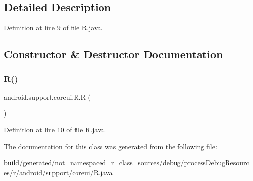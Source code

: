 \subsection{Detailed Description}


Definition at line 9 of file R.\+java.



\subsection{Constructor \& Destructor Documentation}
\mbox{\label{classandroid_1_1support_1_1coreui_1_1_r_a3da75b0c0738bf933a54234a5d209dbd}} 
\subsubsection{\texorpdfstring{R()}{R()}}
{\footnotesize\ttfamily android.\+support.\+coreui.\+R.\+R (\begin{DoxyParamCaption}{ }\end{DoxyParamCaption})\hspace{0.3cm}{\ttfamily [private]}}



Definition at line 10 of file R.\+java.


\begin{DoxyCode}{0}

\end{DoxyCode}


The documentation for this class was generated from the following file\+:\begin{DoxyCompactItemize}
\item 
build/generated/not\+\_\+namespaced\+\_\+r\+\_\+class\+\_\+sources/debug/process\+Debug\+Resources/r/android/support/coreui/\mbox{\hyperlink{android_2support_2coreui_2_r_8java}{R.\+java}}\end{DoxyCompactItemize}
